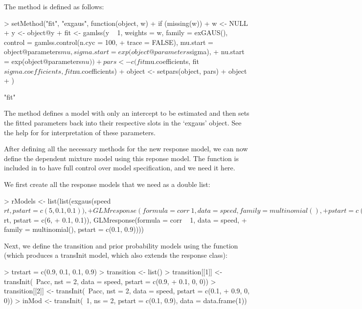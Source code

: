 \documentclass[article]{jss}
\begin{document}
The  method is defined as follows: 
\begin{Schunk}
\begin{Sinput}
> setMethod("fit", "exgaus", function(object, w) {
+     if (missing(w)) 
+         w <- NULL
+     y <- object@y
+     fit <- gamlss(y ~ 1, weights = w, family = exGAUS(), control = gamlss.control(n.cyc = 100, 
+         trace = FALSE), mu.start = object@parameters$mu, sigma.start = exp(object@parameters$sigma), 
+         nu.start = exp(object@parameters$nu))
+     pars <- c(fit$mu.coefficients, fit$sigma.coefficients, fit$nu.coefficients)
+     object <- setpars(object, pars)
+     object
+ })
\end{Sinput}
\begin{Soutput}
[1] "fit"
\end{Soutput}
\end{Schunk}

The  method defines a  model with 
only an intercept to be estimated and then sets the fitted parameters 
back into their respective slots in the `exgaus' object. See the help 
for  for interpretation of these parameters. 

After defining all the necessary methods for the new response model, 
we can  now define the dependent mixture model using this reponse model. 
The function  is included in  to have 
full control over model specification, and we need it here. 

We first create all the response models that we need as a double list: 
\begin{Schunk}
\begin{Sinput}
> rModels <- list(list(exgaus(speed$rt, pstart = c(5, 0.1, 0.1)), 
+     GLMresponse(formula = corr ~ 1, data = speed, family = multinomial(), 
+         pstart = c(0.5, 0.5))), list(exgaus(speed$rt, pstart = c(6, 
+     0.1, 0.1)), GLMresponse(formula = corr ~ 1, data = speed, 
+     family = multinomial(), pstart = c(0.1, 0.9))))
\end{Sinput}
\end{Schunk}

Next, we define the transition and prior probability models using the 
 function (which produces a transInit model, which also extends 
the response class): 
\begin{Schunk}
\begin{Sinput}
> trstart = c(0.9, 0.1, 0.1, 0.9)
> transition <- list()
> transition[[1]] <- transInit(~Pacc, nst = 2, data = speed, pstart = c(0.9, 
+     0.1, 0, 0))
> transition[[2]] <- transInit(~Pacc, nst = 2, data = speed, pstart = c(0.1, 
+     0.9, 0, 0))
> inMod <- transInit(~1, ns = 2, pstart = c(0.1, 0.9), data = data.frame(1))
\end{Sinput}
\end{Schunk}
\end{document}
